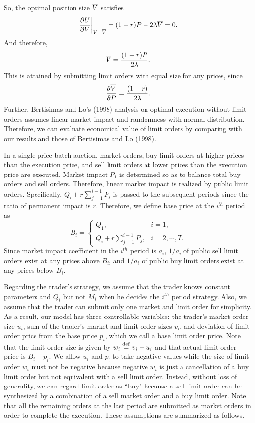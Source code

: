 So, the optimal position size $\overline{V}$ satisfies
\[ %
  \left. \pdif{U}{V} \right|_{V=\ol{V}}= (1-r) P - 2 \lambda \ol{V} = 0.
\] %
And therefore,
\[ %
  \ol{V} = \frac{(1-r) P}{2 \lambda}.
\] %
This is attained by submitting limit orders with equal size for any prices, since
\[ %
  \pdif{\ol{V}}{P} = \frac{(1-r)}{2 \lambda}.
\] %
Further, Bertisimas and Lo's (1998) analysis on optimal execution
without limit orders assumes linear market impact and randomness with
normal distribution.  Therefore, we can evaluate economical value of
limit orders by comparing with our results and those of Bertisimas and Lo (1998).

In a single price batch auction, market orders, buy limit orders at higher prices than the execution price, and sell limit orders at lower prices than the execution price are executed.  Market impact $P_1$ is determined so as to balance total buy orders and sell orders.  Therefore, linear market impact is realized by public limit orders.  Specifically, $\displaystyle Q_i+r \sum_{j=1}^{i-1}P_j$ is passed to the subsequent periods since the ratio of permanent impact is $r$.  Therefore, we define base price at the $i^{th}$ period as
\begin{equation}\label{eq_l6}
  B_i = \left\{
  \begin{array}{ll}
    Q_1, \quad & i=1, \\
    \displaystyle Q_i+ r \sum_{j=1}^{i-1} P_j, & i=2,\cdots,T.
  \end{array}
  \right.
\end{equation}
Since market impact coefficient in the $i^{th}$  period is $a_i$, $1/a_i$ of public sell limit orders exist at any prices above $B_i$, and $1/a_i$ of public buy limit orders exist at any prices below $B_i$.  

Regarding the trader's strategy, we assume that the trader knows constant parameters and $Q_i$ but not $M_i$ when he decides the $i^{th}$ period strategy.  Also, we assume that the trader can submit only one market and limit order for simplicity.  As a result, our model has three controllable variables: the trader's market order size $u_i$, sum of the trader's market and limit order sizes $v_i$, and deviation of limit order price from the base price $p_i$, which we call a base limit order price.  Note that the limit order size is given by $w_i \stackrel{\mathrm{def}}{=} v_i-u_i$ and that actual limit order price is $B_i+p_i$.  We allow $u_i$ and $p_i$ to take negative values while the size of limit order $w_i$ must not be negative because negative $w_i$ is just a cancellation of a buy limit order but not equivalent with a sell limit order.  Instead, without loss of generality, we can regard limit order as ``buy" because a sell limit order can be synthesized by a combination of a sell market order and a buy limit order.  Note that all the remaining orders at the last period are submitted as market orders in order to complete the execution.  These assumptions are summarized as follows.

